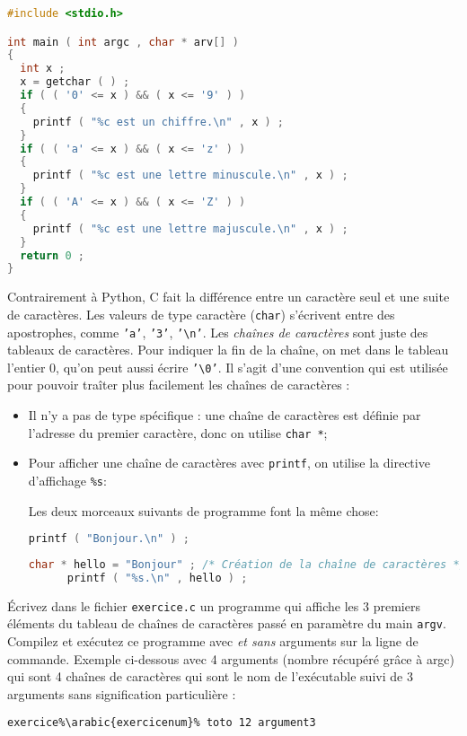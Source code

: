 \begin{solutioncachee}
  \begin{lstlisting}[language=C]
#include <stdio.h>

int main ( int argc , char * arv[] ) 
{ 
  int x ; 
  x = getchar ( ) ;
  if ( ( '0' <= x ) && ( x <= '9' ) ) 
  { 
    printf ( "%c est un chiffre.\n" , x ) ;
  } 
  if ( ( 'a' <= x ) && ( x <= 'z' ) ) 
  { 
    printf ( "%c est une lettre minuscule.\n" , x ) ;
  } 
  if ( ( 'A' <= x ) && ( x <= 'Z' ) ) 
  { 
    printf ( "%c est une lettre majuscule.\n" , x ) ;
  } 
  return 0 ; 
}
  \end{lstlisting}
\end{solutioncachee}


\prerequis {}
Contrairement à Python, C fait la différence entre un caractère seul
et une suite de caractères. Les valeurs de type caractère
(\texttt{char}) s'écrivent entre des apostrophes, comme \texttt{'a'},
\texttt{'3'}, \texttt{'\textbackslash n'}. Les \emph{chaînes de
  caractères} sont juste des tableaux de caractères. Pour indiquer la
fin de la chaîne, on met dans le tableau l'entier \(0\), qu'on peut
aussi écrire \texttt{'\textbackslash 0'}. Il s'agit d'une convention
qui est utilisée pour pouvoir traîter plus facilement les chaînes de
caractères :
\begin{itemize}
\item Il n'y a pas de type spécifique : une chaîne de caractères est
  définie par l'adresse du premier caractère, donc on utilise \texttt{char *};
\item Pour afficher une chaîne de caractères avec \texttt{printf}, on
  utilise la directive d'affichage \texttt{\%s}:
  \begin{exemple}
    Les deux morceaux suivants de programme font la même chose:
    \begin{lstlisting}[language=C]
      printf ( "Bonjour.\n" ) ;
    \end{lstlisting}
    \begin{lstlisting}[language=C]
      char * hello = "Bonjour" ; /* Création de la chaîne de caractères */
      printf ( "%s.\n" , hello ) ;
    \end{lstlisting}
  \end{exemple}
\end{itemize}

\question Écrivez dans le fichier
\texttt{exercice.c} un programme qui affiche les 3
premiers éléments du tableau de chaînes de caractères passé en paramètre du main \texttt{argv}. 
Compilez et exécutez ce programme avec \emph{et sans} arguments sur la ligne de commande.
Exemple ci-dessous avec 4 arguments (nombre récupéré grâce à argc) qui sont 
4 chaînes de caractères qui sont le nom de l'exécutable 
suivi de 3 arguments sans signification particulière :
  \begin{lstlisting}[language=bash,escapechar=\%]
  exercice%\arabic{exercicenum}% toto 12 argument3
  \end{lstlisting}

